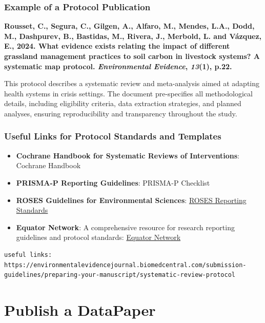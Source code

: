\documentclass[
]{book}
\begin{document}
\subsubsection{Example of a Protocol Publication}\label{example-of-a-protocol-publication}

\textbf{Rousset, C., Segura, C., Gilgen, A., Alfaro, M., Mendes, L.A., Dodd, M., Dashpurev, B., Bastidas, M., Rivera, J., Merbold, L. and Vázquez, E., 2024. What evidence exists relating the impact of different grassland management practices to soil carbon in livestock systems? A systematic map protocol. \emph{Environmental Evidence}, \emph{13}(1), p.22.}

This protocol describes a systematic review and meta-analysis aimed at adapting health systems in crisis settings.
The document pre-specifies all methodological details, including eligibility criteria, data extraction strategies, and planned analyses, ensuring reproducibility and transparency throughout the study.

\subsubsection{Useful Links for Protocol Standards and Templates}\label{useful-links-for-protocol-standards-and-templates}

\begin{itemize}
\item
  \textbf{Cochrane Handbook for Systematic Reviews of Interventions}: Cochrane Handbook
\item
  \textbf{PRISMA-P Reporting Guidelines}: PRISMA-P Checklist
\item
  \textbf{ROSES Guidelines for Environmental Sciences}: \href{http://www.roses-reporting.com}{ROSES Reporting Standards}
\item
  \textbf{Equator Network}: A comprehensive resource for research reporting guidelines and protocol standards: \href{https://www.equator-network.org}{Equator Network}
\end{itemize}

\begin{verbatim}
useful links: https://environmentalevidencejournal.biomedcentral.com/submission-guidelines/preparing-your-manuscript/systematic-review-protocol
\end{verbatim}

\section{Publish a DataPaper}\label{publish-a-datapaper}
\end{document}
